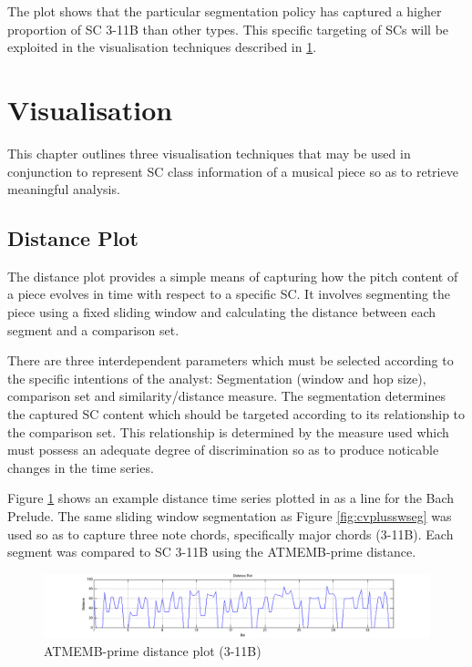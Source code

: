 \documentclass{article}
\begin{document}
The plot shows that the particular segmentation policy has captured a
higher proportion of SC 3-11B than other types. This specific
targeting of SCs will be exploited in the visualisation techniques
described in \ref{sec-9}.
\section{Visualisation}
\label{sec-9}

This chapter outlines three visualisation techniques that may be used
in conjunction to represent SC class information of a musical piece so
as to retrieve meaningful analysis.
\subsection{Distance Plot}
\label{sec-9-1}

The distance plot provides a simple means of capturing how the pitch
content of a piece evolves in time with respect to a specific SC. It
involves segmenting the piece using a fixed sliding window and
calculating the distance between each segment and a comparison set.

There are three interdependent parameters which must be selected
according to the specific intentions of the analyst: Segmentation
(window and hop size), comparison set and similarity/distance
measure. The segmentation determines the captured SC content which
should be targeted according to its relationship to the comparison
set. This relationship is determined by the measure used which must
possess an adequate degree of discrimination so as to produce
noticable changes in the time series.

Figure \ref{fig:distplot} shows an example distance time series
plotted in as a line for the Bach Prelude. The same sliding window
segmentation as Figure \ref{fig:cvplusswseg} was used so as to capture
three note chords, specifically major chords (3-11B). Each segment was
compared to SC 3-11B using the ATMEMB-prime distance.

\begin{figure}[htb]
\centering
\includegraphics[width=.9\linewidth]{../plots/distplot.png}
\caption{\label{fig:distplot}ATMEMB-prime distance plot (3-11B)}
\end{figure}
\end{document}
